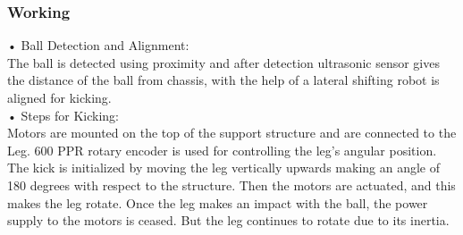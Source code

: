 
        \subsubsection{Working}       
            •  Ball Detection and Alignment:                                                                                                        \\
            The ball is detected using proximity and after detection ultrasonic sensor gives the distance of the ball from chassis,
            with the help of a lateral shifting robot is aligned for kicking.                                                                       \\
            •  Steps for Kicking:                                                                                                                   \\
            Motors are mounted on the top of the support structure and are connected to the Leg. 600 PPR rotary encoder is
            used for controlling the leg’s angular position. The kick is initialized by moving the leg vertically upwards making
            an angle of 180 degrees with respect to the structure. Then the motors are actuated, and this makes the leg rotate.
            Once the leg makes an impact with the ball, the power supply to the motors is ceased. But the leg continues to rotate
            due to its inertia.                                                                                                                     \\   

            \vspace{0.1cm}

